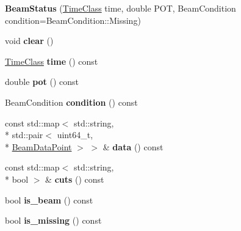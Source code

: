 \begin{DoxyCompactItemize}
\item 
\hypertarget{classBeamStatus_a8763cbecad2a03bdc4d4799fd2d68569}{{\bfseries Beam\-Status} (\hyperlink{classTimeClass}{Time\-Class} time, double P\-O\-T, Beam\-Condition condition=Beam\-Condition\-::\-Missing)}\label{classBeamStatus_a8763cbecad2a03bdc4d4799fd2d68569}

\item 
\hypertarget{classBeamStatus_ad9786a1628d6180d3abbc74daef3d677}{void {\bfseries clear} ()}\label{classBeamStatus_ad9786a1628d6180d3abbc74daef3d677}

\item 
\hypertarget{classBeamStatus_a041fe2a720d2c24391fdaa578754e315}{\hyperlink{classTimeClass}{Time\-Class} {\bfseries time} () const }\label{classBeamStatus_a041fe2a720d2c24391fdaa578754e315}

\item 
\hypertarget{classBeamStatus_a234b45ea673b396d29b4a40061c633c9}{double {\bfseries pot} () const }\label{classBeamStatus_a234b45ea673b396d29b4a40061c633c9}

\item 
\hypertarget{classBeamStatus_a1e0b28ff6f6e0fdc60242e395d836dca}{Beam\-Condition {\bfseries condition} () const }\label{classBeamStatus_a1e0b28ff6f6e0fdc60242e395d836dca}

\item 
\hypertarget{classBeamStatus_a0d1a612eece988337b69b39b73d8170e}{const std\-::map$<$ std\-::string, \\*
std\-::pair$<$ uint64\-\_\-t, \\*
\hyperlink{structBeamDataPoint}{Beam\-Data\-Point} $>$ $>$ \& {\bfseries data} () const }\label{classBeamStatus_a0d1a612eece988337b69b39b73d8170e}

\item 
\hypertarget{classBeamStatus_a4b0a3f4fcce7aa7e3fa1e62c6f833d57}{const std\-::map$<$ std\-::string, \\*
bool $>$ \& {\bfseries cuts} () const }\label{classBeamStatus_a4b0a3f4fcce7aa7e3fa1e62c6f833d57}

\item 
\hypertarget{classBeamStatus_a106c1657c2cc64e76fac1179ba411485}{bool {\bfseries is\-\_\-beam} () const }\label{classBeamStatus_a106c1657c2cc64e76fac1179ba411485}

\item 
\hypertarget{classBeamStatus_a81a21d4debb9d1497024398bd8834ba3}{bool {\bfseries is\-\_\-missing} () const }\label{classBeamStatus_a81a21d4debb9d1497024398bd8834ba3}


\end{DoxyCompactItemize}
